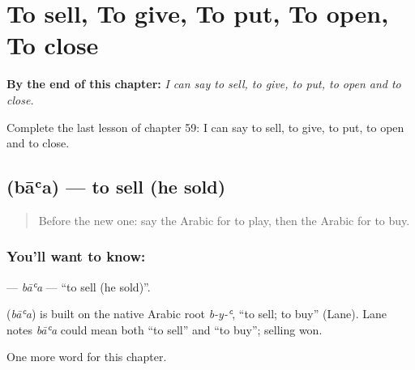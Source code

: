 
\chapter{To sell, To give, To put, To open, To close}
\label{ch:ar-to-sell-to-give-to-put-to-open-to-close}

\begin{chapteropening}
\textbf{By the end of this chapter:} \emph{I can say to sell, to give, to put, to open and to close.}

Complete the last lesson of chapter 59: I can say to sell, to give, to put, to open and to close.
\end{chapteropening}

\section[\texorpdfstring{\ar{باع} (bāʿa)}{باع (bāʿa)}]{ (bāʿa) — to sell (he sold)}

\label{lesson:AR-C59-baa}



\begin{quote}
Before the new one: say the Arabic for to play, then the Arabic for to buy.
\end{quote}

\subsection*{You'll want to know: }
\textbf{} — \emph{bāʿa} — \textquotedblleft{}to sell (he sold)\textquotedblright{}.

\begin{cousinweb}
\textbf{} (\emph{bāʿa}) is built on the native Arabic root \emph{b-y-ʿ}, \textquotedblleft{}to sell; to buy\textquotedblright{} (Lane). Lane notes \emph{bāʿa} could mean both \textquotedblleft{}to sell\textquotedblright{} and \textquotedblleft{}to buy\textquotedblright{}; selling won.
\end{cousinweb}

\begin{grammarlens}[title={What you've built}]
One more word for this chapter.
\end{grammarlens}

